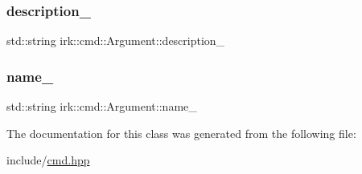 \subsubsection{\texorpdfstring{description\+\_\+}{description\_}}
{\footnotesize\ttfamily std\+::string irk\+::cmd\+::\+Argument\+::description\+\_\+\hspace{0.3cm}{\ttfamily [protected]}}

\mbox{\label{classirk_1_1cmd_1_1Argument_ad6b66658e47667e49c9df69571607e58}} 
\subsubsection{\texorpdfstring{name\+\_\+}{name\_}}
{\footnotesize\ttfamily std\+::string irk\+::cmd\+::\+Argument\+::name\+\_\+\hspace{0.3cm}{\ttfamily [protected]}}



The documentation for this class was generated from the following file\+:\begin{DoxyCompactItemize}
\item 
include/\mbox{\hyperlink{cmd_8hpp}{cmd.\+hpp}}\end{DoxyCompactItemize}
